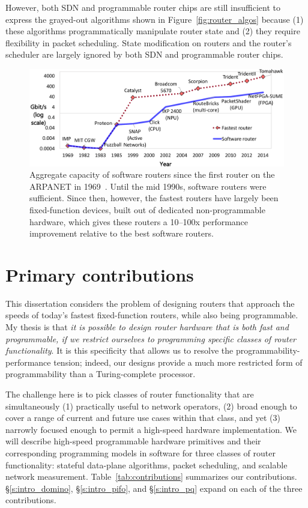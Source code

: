 However, both SDN and programmable router chips are still insufficient to
express the grayed-out algorithms shown in Figure~\ref{fig:router_algos}
because (1) these algorithms programmatically manipulate router state and (2)
they require flexibility in packet scheduling.  State modification on routers
and the router's scheduler are largely ignored by both SDN and programmable
router chips.

\begin{figure}
\centering
\includegraphics[width=\columnwidth]{router_evolution.pdf}
\caption{Aggregate capacity of software routers since the first router on the
ARPANET in 1969~\cite{imp}. Until the mid 1990s, software routers were
sufficient. Since then, however, the fastest routers have largely been
fixed-function devices, built out of dedicated non-programmable hardware, which
gives these routers a 10--100x performance improvement relative to the best
software routers.}
\label{fig:router_evolution}
\end{figure}

\section{Primary contributions}


This dissertation considers the problem of designing routers that approach the
speeds of today's fastest fixed-function routers, while also being
programmable. My thesis is that {\em it is possible to design router hardware
that is both fast and programmable, if we restrict ourselves to programming
specific classes of router functionality}. It is this specificity that allows
us to resolve the programmability-performance tension; indeed, our designs
provide a much more restricted form of programmability than a Turing-complete
processor.

The challenge here is to pick classes of router functionality that are
simultaneously (1) practically useful to network operators, (2) broad enough to
cover a range of current and future use cases within that class, and yet (3)
narrowly focused enough to permit a high-speed hardware implementation.  We
will describe high-speed programmable hardware primitives and their
corresponding programming models in software for three classes of router
functionality: stateful data-plane algorithms, packet scheduling, and scalable
network measurement.  Table~\ref{tab:contributions} summarizes our
contributions. \S\ref{s:intro_domino}, \S\ref{s:intro_pifo}, and \S\ref{s:intro_pq}
expand on each of the three contributions.

